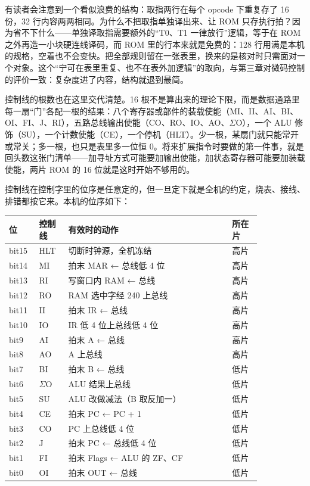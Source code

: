 有读者会注意到一个看似浪费的结构：取指两行在每个 opcode 下重复存了 16 份，32 行内容两两相同。为什么不把取指单独译出来、让 ROM 只存执行拍？因为省不下什么——单独译取指需要额外的“T0、T1 一律放行”逻辑，等于在 ROM 之外再造一小块硬连线译码，而 ROM 里的行本来就是免费的：128 行用满是本机的规格，空着也不会变快。把全部规则留在一张表里，换来的是核对时只需面对一个对象。这个“宁可在表里重复、也不在表外加逻辑”的取向，与第三章对微码控制的评价一致：复杂度进了内容，结构就退到最简。

控制线的根数也在这里交代清楚。16 根不是算出来的理论下限，而是数据通路里每一扇“门”各配一根的结果：八个寄存器或部件的装载使能（MI、II、AI、BI、OI、FI、J、RI），五路总线输出使能（CO、RO、IO、AO、$\Sigma$O），一个 ALU 修饰（SU），一个计数使能（CE），一个停机（HLT）。少一根，某扇门就只能常开或常关；多一根，也只是表里多一位恒 0。将来扩展指令时要做的第一件事，就是回头数这张门清单——加寻址方式可能要加输出使能，加状态寄存器可能要加装载使能，两片 ROM 的 16 位就是这时开始不够用的。

控制线在控制字里的位序是任意定的，但一旦定下就是全机的约定，烧表、接线、排错都按它来。本机的位序如下：

\begin{longtable}{L{0.08\linewidth}L{0.10\linewidth}L{0.56\linewidth}L{0.10\linewidth}}
\toprule
位 & 控制线 & 有效时的动作 & 所在片 \\
\midrule
bit15 & HLT & 切断时钟源，全机冻结 & 高片 \\
bit14 & MI & 拍末 MAR ← 总线低 4 位 & 高片 \\
bit13 & RI & 写窗口内 RAM ← 总线 & 高片 \\
bit12 & RO & RAM 选中字经 240 上总线 & 高片 \\
bit11 & II & 拍末 IR ← 总线 & 高片 \\
bit10 & IO & IR 低 4 位上总线低 4 位 & 高片 \\
bit9 & AI & 拍末 A ← 总线 & 高片 \\
bit8 & AO & A 上总线 & 高片 \\
bit7 & BI & 拍末 B ← 总线 & 低片 \\
bit6 & $\Sigma$O & ALU 结果上总线 & 低片 \\
bit5 & SU & ALU 改做减法（B 取反加一） & 低片 \\
bit4 & CE & 拍末 PC ← PC + 1 & 低片 \\
bit3 & CO & PC 上总线低 4 位 & 低片 \\
bit2 & J & 拍末 PC ← 总线低 4 位 & 低片 \\
bit1 & FI & 拍末 Flags ← ALU 的 ZF、CF & 低片 \\
bit0 & OI & 拍末 OUT ← 总线 & 低片 \\
\bottomrule
\end{longtable}


